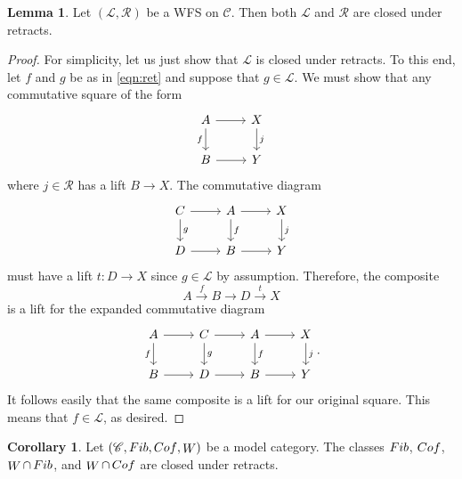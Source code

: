 \documentclass[10pt,letterpaper,cm]{nupset}
\theoremstyle{definition}
\theoremstyle{theorem}
\newtheorem{lemma}[definition]{Lemma}
\newtheorem{corollary}[definition]{Corollary}
\theoremstyle{remark}
\renewcommand{\L}{\mathcal L}
\newcommand{\RI}{\mathcal R}
\newcommand{\0}{\mathbf{0}}
\newcommand{\1}{\mathbf{1}}
\newcommand{\2}{\mathbf{2}}
\renewcommand{\c}{\mathscr{C}}
\DeclareMathOperator{\fib}{\mathnormal{Fib}}
\DeclareMathOperator{\cof}{\mathnormal{Cof}}
\DeclareMathOperator{\we}{\mathnormal{W}}
\begin{document}
\begin{lemma}\label{cloret}
Let $\left(\L, \RI\right)$ be a WFS on $\c$. Then both $\L$ and $\RI$ are closed under retracts. 
\end{lemma}
\begin{proof}
For simplicity, let us just show that $\L$ is closed under retracts. To this end, let $f$ and $g$ be as in \eqref{eqn:ret} and suppose that $g\in \L$.  We must show that any commutative square of the form
\[
\begin{tikzcd}
A \arrow[d, "f"'] \arrow[r] & X \arrow[d, "j"] \\
B \arrow[r]                 & Y               
\end{tikzcd}
\] where $j\in \RI$ has a lift $B \to X$. The commutative diagram 
\[
\begin{tikzcd}
C \arrow[d, "g"] \arrow[r] & A \arrow[d, "f"] \arrow[r] & X \arrow[d, "j"] \\
D \arrow[r]                & B \arrow[r]                & Y               
\end{tikzcd}
\] must have a lift $t: D\to X$ since $g\in \L$ by assumption. Therefore, the composite $$A \overset{f}{\longrightarrow} B \longrightarrow D \overset{t}{\longrightarrow} X$$ is a lift for the expanded commutative diagram
\[
\begin{tikzcd}
A \arrow[d, "f"'] \arrow[r] & C \arrow[d, "g"] \arrow[r] & A \arrow[d, "f"] \arrow[r] & X \arrow[d, "j"] \\
B \arrow[r]                 & D \arrow[r]                & B \arrow[r]                & Y               
\end{tikzcd}.
\] It follows easily that the same composite is a lift for our original square. This means that $f\in \L$, as desired.
\end{proof}

\begin{corollary}\label{CR}
Let  $\left(\c, \fib, \cof, \we\right)$ be a model category. The classes $\fib$, $\cof$, $\we \cap \fib$, and $\we \cap \cof$  are closed under retracts.
\end{corollary}
\end{document}

